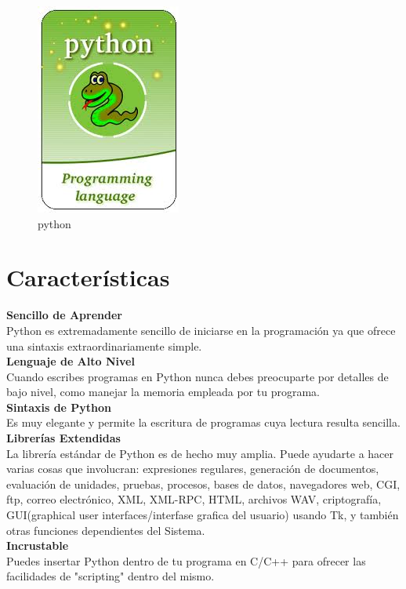 \documentclass[11pt]{article} %
\begin{document}
\begin{figure}[htbp]
\begin{center}
\includegraphics[width=.30\textwidth]{./imagenes/pythonXD.jpg}
\caption{python}
\label{qt}
\end{center}
\end{figure}

\section{Características}

\textbf{Sencillo de Aprender}
\\    Python es extremadamente sencillo de iniciarse en la programación ya que ofrece una sintaxis extraordinariamente simple.\\

\textbf{Lenguaje de Alto Nivel}
\\    Cuando escribes programas en Python nunca debes preocuparte por detalles de bajo nivel, como manejar la memoria empleada por tu programa.\\

\textbf{Sintaxis de Python}
\\	  Es muy elegante y permite la escritura de programas cuya lectura resulta sencilla.\\

\textbf{Librerías Extendidas}
\\	  La librería estándar de Python es de hecho muy amplia. Puede ayudarte a hacer varias cosas que involucran: expresiones regulares, generación de documentos, evaluación de unidades, pruebas, procesos, bases de datos, navegadores web, CGI, ftp, correo electrónico, XML, XML-RPC, HTML, archivos WAV, criptografía, GUI(graphical user interfaces/interfase grafica del usuario) usando Tk, y también otras funciones dependientes del Sistema.\\

\textbf{Incrustable}
\\    Puedes insertar Python dentro de tu programa en C/C++ para ofrecer las facilidades de "scripting" dentro del mismo.\\
\end{document}
